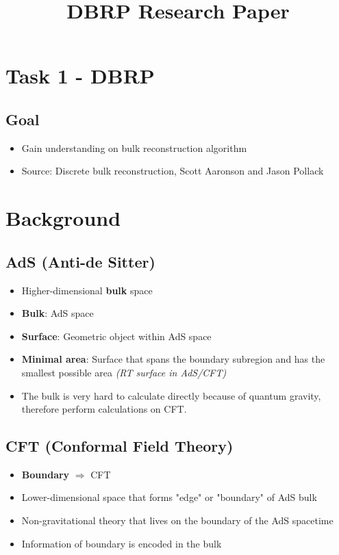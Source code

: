 \documentclass{article}
\title{DBRP Research Paper}
\author{}
\date{}
\begin{document}
\maketitle

\section{Task 1 - DBRP}

\subsection*{Goal}
\begin{itemize}
    \item Gain understanding on bulk reconstruction algorithm
    \item Source: Discrete bulk reconstruction, Scott Aaronson and Jason Pollack
\end{itemize}

\section{Background}

\subsection{AdS (Anti-de Sitter)}
\begin{itemize}
    \item Higher-dimensional \textbf{bulk} space
    \item \textbf{Bulk}: AdS space
    \item \textbf{Surface}: Geometric object within AdS space
    \item \textbf{Minimal area}: Surface that spans the boundary subregion and has the smallest possible area \textit{(RT surface in AdS/CFT)}
    \item The bulk is very hard to calculate directly because of quantum gravity, therefore perform calculations on CFT.
\end{itemize}

\subsection{CFT (Conformal Field Theory)}
\begin{itemize}
    \item \textbf{Boundary} $\Rightarrow$ CFT
    \item Lower-dimensional space that forms "edge" or "boundary" of AdS bulk
    \item Non-gravitational theory that lives on the boundary of the AdS spacetime
    \item Information of boundary is encoded in the bulk
\end{itemize}
\end{document}
